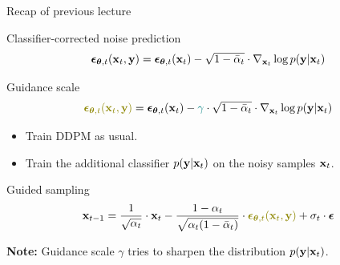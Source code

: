 \begin{frame}{Recap of previous lecture}
	\begin{block}{Classifier-corrected noise prediction}
		\vspace{-0.3cm}
		\[
			\boldsymbol{\epsilon}_{\boldsymbol{\theta}, t}(\mathbf{x}_t, \mathbf{y}) = \boldsymbol{\epsilon}_{\boldsymbol{\theta}, t}(\mathbf{x}_t) - \sqrt{1 - \bar{\alpha}_t} \cdot \nabla_{\mathbf{x}_t} \log p(\mathbf{y} | \mathbf{x}_t)
		\]
		\vspace{-0.5cm}
	\end{block}
	\begin{block}{Guidance scale}
		\vspace{-0.3cm}
		\[
			{\color{olive}\bepsilon_{\btheta, t}(\bx_t, \by)} = \bepsilon_{\btheta, t}(\bx_t) - {\color{teal}\gamma} \cdot \sqrt{1 - \bar{\alpha}_t} \cdot \nabla_{\bx_t} \log p(\by | \bx_t)
		\]
		\vspace{-0.5cm}
	\end{block}
	\begin{itemize}
		\item Train DDPM as usual.
		\item Train the additional classifier $p(\mathbf{y} | \mathbf{x}_t)$ on the noisy samples $\mathbf{x}_t$.
	\end{itemize}
	\begin{block}{Guided sampling}
		\vspace{-0.3cm}
		\[
			\bx_{t-1} = \frac{1}{\sqrt{\alpha_t}} \cdot \bx_t - \frac{1 - \alpha_t}{\sqrt{\alpha_t (1 - \bar{\alpha}_t)}} \cdot  {\color{olive}\bepsilon_{\btheta, t}(\bx_t, \by)} + \sigma_t \cdot \bepsilon
		\]
		\vspace{-0.3cm}
	\end{block}
	\textbf{Note:} Guidance scale $\gamma$ tries to sharpen the distribution $p(\mathbf{y} | \mathbf{x}_t)$.
\end{frame}
